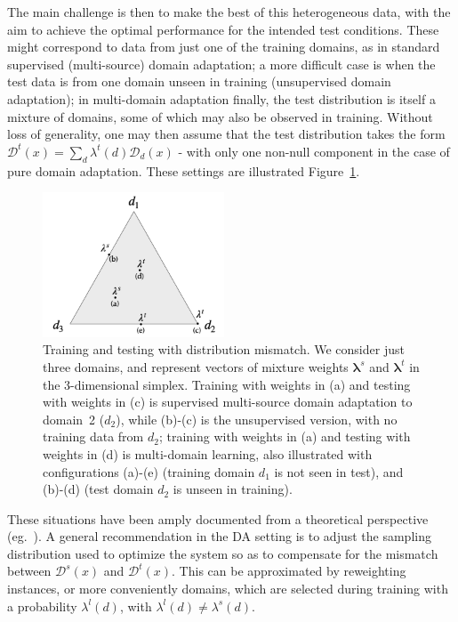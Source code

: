 \documentclass[11pt]{article}
\newcommand{\vlambda}{\ensuremath{\boldsymbol\lambda}\xspace} %
\begin{document}
The main challenge is then to make the best of this heterogeneous data, with the aim to achieve the optimal performance for the intended test conditions. These might correspond to data from just one of the training domains, as in standard supervised (multi-source) domain adaptation; a more difficult case is when the test data is from one domain unseen in training (unsupervised domain adaptation); in multi-domain adaptation finally, the test distribution is itself a mixture of domains, some of which may also be observed in training.  Without loss of generality, one may then assume that the test distribution takes the form $\mathcal{D}^{t}(x) = \sum_d \lambda^{t}(d) \mathcal{D}_d(x)$ - with only one non-null  component in the case of pure domain adaptation. These settings are illustrated Figure~\ref{fig:mdmt-lambdas}.
\begin{figure}[h]
  \centering
  \includegraphics[width=0.48\textwidth]{mdmt-lambdas}
  \caption{Training and testing with distribution mismatch. We consider just three domains, and represent vectors of mixture weights $\vlambda^{s}$ and $\vlambda^{t}$ in the 3-dimensional simplex. Training with weights in (a) and testing with weights in (c) is supervised multi-source domain adaptation to domain~2 ($d_2$), while (b)-(c) is the unsupervised version, with no training data from $d_2$; training with weights in (a) and testing with weights in (d) is multi-domain learning, also illustrated with configurations (a)-(e) (training domain $d_1$ is not seen in test), and (b)-(d)  (test domain $d_2$ is unseen in training).}\label{fig:mdmt-lambdas}
\end{figure}

These situations have been amply documented from a theoretical perspective (eg.\ \cite{Mansour09multiple,Mansour09domainadaptation,Hoffman18algorithms}). A general recommendation in the DA setting is to adjust the sampling distribution used to optimize the system so as to compensate for the mismatch between $\mathcal{D}^s(x)$ and $\mathcal{D}^t(x)$. This can be approximated by reweighting instances, or more conveniently domains, which are selected during training with a probability $\lambda^{l}(d)$, with $\lambda^{l}(d) \neq \lambda^{s}(d)$.
\end{document}
